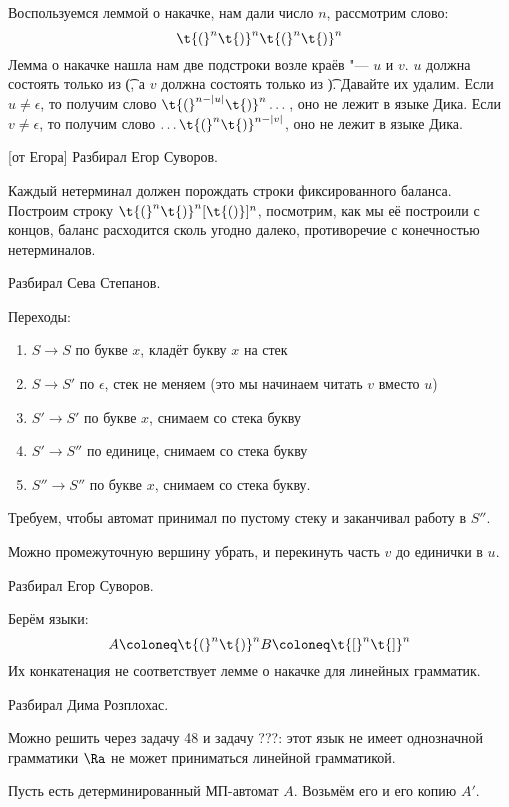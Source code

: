 	Воспользуемся леммой о накачке, нам дали число $n$, рассмотрим слово:
	\[
		\t{(}^n \t{)}^n \t{(}^n \t{)}^n
	\]
	Лемма о накачке нашла нам две подстроки возле краёв "--- $u$ и $v$.
	$u$ должна состоять только из \t{(}, а $v$ должна состоять только из \t{)}.
	Давайте их удалим.
	Если $u \ne \epsilon$, то получим слово $\t{(}^{n-|u|}\t{)}^n\dots$, оно не лежит в языке Дика.
	Если $v \ne \epsilon$, то получим слово $\dots\t{(}^n\t{)}^{n-|v|}$, оно не лежит в языке Дика.

[от Егора]\label{prob44_egor}
	Разбирал Егор Суворов.

	Каждый нетерминал должен порождать строки фиксированного баланса.
	Построим строку $\t{(}^n\t{)}^n[\t{()}]^{n}$, посмотрим, как мы её построили с концов, баланс расходится сколь угодно далеко,
	противоречие с конечностью нетерминалов.

	Разбирал Сева Степанов.

	Переходы:
	\begin{enumerate}
		\item
			$S\to S$ по букве $x$, кладёт букву $x$ на стек
		\item
			$S\to S'$ по $\epsilon$, стек не меняем (это мы начинаем читать $v$ вместо $u$)
		\item
			$S' \to S'$ по букве $x$, снимаем со стека букву
		\item
			$S' \to S''$ по единице, снимаем со стека букву
		\item
			$S'' \to S''$ по букве $x$, снимаем со стека букву.
	\end{enumerate}
	Требуем, чтобы автомат принимал по пустому стеку и заканчивал работу в $S''$.

	\begin{Rem}
		Можно промежуточную вершину убрать, и перекинуть часть $v$ до единички в $u$.
	\end{Rem}

	Разбирал Егор Суворов.

	Берём языки:
	\[
		A \coloneq \t{(}^n\t{)}^n \\
		B \coloneq \t{[}^n\t{]}^n
	\]
	Их конкатенация не соответствует лемме о накачке для линейных грамматик.

	Разбирал Дима Розплохас.

	\begin{Rem}
		Можно решить через задачу 48 и задачу ???: этот язык не имеет однозначной грамматики $\Ra$ не может приниматься линейной грамматикой.
	\end{Rem}
	Пусть есть детерминированный МП-автомат $A$.
	Возьмём его и его копию $A'$.

